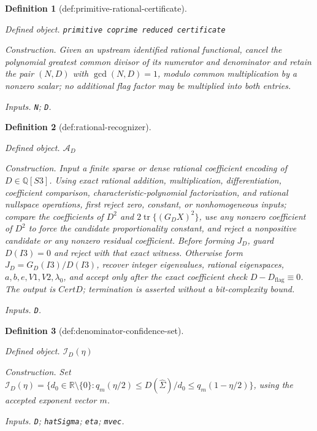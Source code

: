 \documentclass{article}
\newtheorem{definition}{Definition}
\begin{document}
\begin{definition}[def:primitive-rational-certificate]\label{def:primitive-rational-certificate}
\par\smallskip\noindent\emph{Defined object.} \texttt{primitive coprime reduced certificate}
\par\smallskip\noindent\emph{Construction.} Given an upstream identified rational functional, cancel the polynomial greatest common divisor of its numerator and denominator and retain the pair \((N,D)\) with \(\gcd(N,D)=1\), modulo common multiplication by a nonzero scalar; no additional flag factor may be multiplied into both entries.
\par\smallskip\noindent\emph{Inputs.} \texttt{N}; \texttt{D}.
\end{definition}

\begin{definition}[def:rational-recognizer]\label{def:rational-recognizer}
\par\smallskip\noindent\emph{Defined object.} \(\mathcal A_D\)
\par\smallskip\noindent\emph{Construction.} Input a finite sparse or dense rational coefficient encoding of \(D\in\mathbb Q[S3]\). Using exact rational addition, multiplication, differentiation, coefficient comparison, characteristic-polynomial factorization, and rational nullspace operations, first reject zero, constant, or nonhomogeneous inputs; compare the coefficients of \(D^2\) and \(2\operatorname{tr}\{(G_DX)^2\}\), use any nonzero coefficient of \(D^2\) to force the candidate proportionality constant, and reject a nonpositive candidate or any nonzero residual coefficient. Before forming \(J_D\), guard \(D(I3)=0\) and reject with that exact witness. Otherwise form \(J_D=G_D(I3)/D(I3)\), recover integer eigenvalues, rational eigenspaces, \(a,b,e,V1,V2,\lambda_0\), and accept only after the exact coefficient check \(D-D_{\mathrm{flag}}\equiv0\). The output is \(CertD\); termination is asserted without a bit-complexity bound.
\par\smallskip\noindent\emph{Inputs.} \texttt{D}.
\end{definition}

\begin{definition}[def:denominator-confidence-set]\label{def:denominator-confidence-set}
\par\smallskip\noindent\emph{Defined object.} \(\mathcal I_D(\eta)\)
\par\smallskip\noindent\emph{Construction.} Set \(\mathcal I_D(\eta)=\{d_0\in\mathbb R\setminus\{0\}:q_m(\eta/2)\leq D(\widehat\Sigma)/d_0\leq q_m(1-\eta/2)\}\), using the accepted exponent vector \(m\).
\par\smallskip\noindent\emph{Inputs.} \texttt{D}; \texttt{hatSigma}; \texttt{eta}; \texttt{mvec}.
\end{definition}
\end{document}
